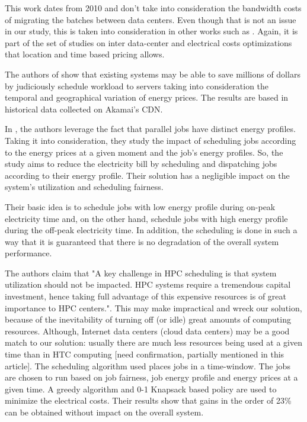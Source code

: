 This work dates from 2010 and don't take into consideration the bandwidth costs
of migrating the batches between data centers. Even though that is not an issue
in our study, this is taken into consideration in other works such as
\cite{MIGRATION_CLOUD}. Again, it is part of the set of studies on inter
data-center and electrical costs optimizations that location and time based 
pricing allows.


The authors of \cite{CUTTING_BILL} show that existing systems may be able to
save millions of dollars by judiciously schedule workload to servers taking into
consideration the temporal and geographical variation of energy prices. The
results are based in historical data collected on Akamai's CDN. 

In \cite{DYN_PRICING_HPC}, the authors leverage the fact that parallel jobs have 
distinct energy profiles. Taking it into consideration, they study the impact of
scheduling jobs according to the energy prices at a given moment and the job's
energy profiles. So, the study aims to reduce the electricity bill by scheduling and
dispatching jobs according to their energy profile. Their solution has a
negligible impact on the system's utilization and scheduling fairness. 

Their basic idea is to schedule jobs with low energy profile during on-peak
electricity time and, on the other hand, schedule jobs with high energy profile
during the off-peak electricity time. In addition, the scheduling is done in
such a way that it is guaranteed that there is no degradation of the overall
system performance. 

The authors claim that "A key challenge in HPC scheduling is that system 
utilization should not be impacted. HPC systems require a tremendous capital 
investment, hence taking full advantage of this expensive resources is of great 
importance to HPC centers.". This may make impractical and wreck our solution,
because of the inevitability of turning off (or idle) great amounts of computing 
resources. Although, Internet data centers (cloud data centers)  may be a good 
match to our solution: usually there are much less resources being used at a given 
time than in HTC computing [need confirmation, partially mentioned in this article]. The scheduling algorithm used places jobs in a time-window. The jobs are chosen
to run based on job fairness, job energy profile and energy prices at a given
time. A greedy algorithm and 0-1 Knapsack based policy are used to minimize the
electrical costs. Their results show that gains in the order of 23\% can be obtained without
impact on the overall system. 

